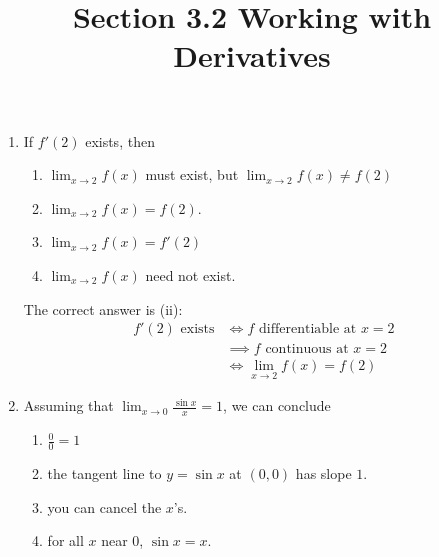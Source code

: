 \documentclass[nooutcomes,handout]{ximera}
\title{Section 3.2 Working with Derivatives}
\begin{document}
\begin{abstract}		\end{abstract}
\maketitle

\begin{problem}
	
	\begin{enumerate}

    \item
   
      If $f'(2)$ exists, then
      \begin{enumerate}
        \item
          $\lim_{x \to 2} f(x)$ must exist, but $\lim_{x \to 2} f(x) \ne f(2)$

        \item
          $\lim_{x \to 2} f(x) = f(2)$.

        \item
          $\lim_{x \to 2} f(x) = f'(2)$

        \item
          $\lim_{x \to 2} f(x)$ need not exist.
      \end{enumerate}
      \begin{freeResponse}
        The correct answer is (ii):
        \begin{align*}
          \mbox{$f'(2)$ exists} &\iff \mbox{$f$ differentiable at $x = 2$}\\
                                &\implies \mbox{$f$ continuous at $x = 2$}\\
                                &\iff \lim_{x \to 2} f(x) = f(2)
        \end{align*}
      \end{freeResponse}


    \item

      Assuming that $\lim_{x \to 0} \frac{\sin x}{x} = 1$, we can conclude
      \begin{enumerate}
        \item
          $\frac{0}{0} = 1$
        \item
          the tangent line to $y = \sin x$ at $(0,0)$ has slope $1$.

        \item
          you can cancel the $x$'s.

        \item
          for all $x$ near $0$, $\sin x = x$.


\end{enumerate}
\end{enumerate}
\end{problem}
\end{document}
